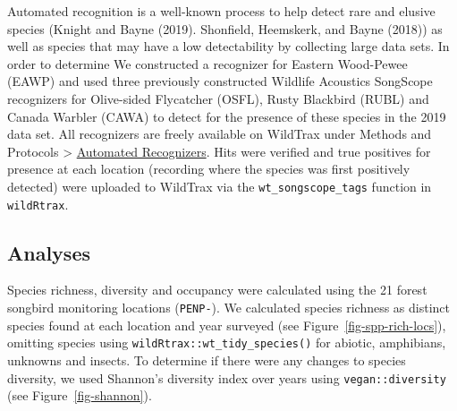 \documentclass[
  letterpaper,
  DIV=11,
  numbers=noendperiod,
  oneside]{scrartcl}
\begin{document}
Automated recognition is a well-known process to help detect rare and
elusive species (Knight and Bayne
(2019).
Shonfield, Heemskerk, and Bayne
(2018))
as well as species that may have a low detectability by collecting large
data sets. In order to determine We constructed a recognizer for Eastern
Wood-Pewee (EAWP) and used three previously constructed Wildlife
Acoustics SongScope recognizers for Olive-sided Flycatcher (OSFL), Rusty
Blackbird (RUBL) and Canada Warbler (CAWA) to detect for the presence of
these species in the 2019 data set. All recognizers are freely available
on WildTrax under Methods and Protocols \textgreater{}
\href{https://wildtrax.ca/resources/methods-protocols/automated-recognizers/}{Automated
Recognizers}. Hits were verified and true positives for presence at each
location (recording where the species was first positively detected)
were uploaded to WildTrax via the \texttt{wt\_songscope\_tags} function
in \texttt{wildRtrax}.

\hypertarget{analyses}{%
\subsection{Analyses}\label{analyses}}

Species richness, diversity and occupancy were calculated using the 21
forest songbird monitoring locations (\texttt{PENP-}). We calculated
species richness as distinct species found at each location and year
surveyed (see Figure~\ref{fig-spp-rich-locs}), omitting species using
\texttt{wildRtrax::wt\_tidy\_species()} for abiotic, amphibians,
unknowns and insects. To determine if there were any changes to species
diversity, we used Shannon's diversity index over years using
\texttt{vegan::diversity} (see Figure~\ref{fig-shannon}).
\end{document}
